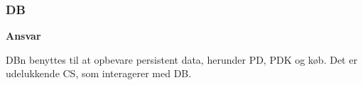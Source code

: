 \subsubsection{\gls{DB}}

\textbf{Ansvar}

\gls{DB}n benyttes til at opbevare persistent data, herunder \gls{PD}, \gls{PDK} og køb. Det er udelukkende \gls{CS}, som interagerer med \gls{DB}.